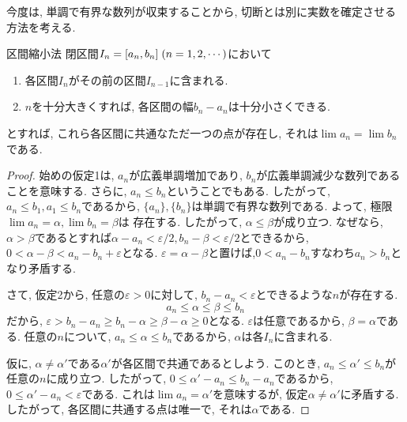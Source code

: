         今度は, 単調で有界な数列が収束することから, 切断とは別に実数を確定させる方法を考える.
        \begin{itembox}{区間縮小法}
            閉区間$I_n=[a_n,b_n]\hspace{1mm}(n=1,2,\cdots)$において
            \begin{enumerate}
                \item 各区間$I_n$がその前の区間$I_{n-1}$に含まれる.
                \item $n$を十分大きくすれば, 各区間の幅$b_n-a_n$は十分小さくできる.
            \end{enumerate}
            とすれば, これら各区間に共通なただ一つの点が存在し, それは$\lim a_n=\lim b_n$である.
        \end{itembox}
        \begin{proof}
            始めの仮定1は, $a_n$が広義単調増加であり, $b_n$が広義単調減少な数列であることを意味する. さらに, $a_n\leq b_n$ということでもある.
            したがって, $a_n\leq b_1,a_1\leq b_n$であるから, $\{a_n\},\{b_n\}$は単調で有界な数列である. よって, 極限$\lim a_n =\alpha , \lim b_n=\beta$は
            存在する. したがって, $\alpha\leq \beta$が成り立つ. なぜなら, $\alpha>\beta$であるとすれば$\alpha -a_n<\varepsilon/2,b_n-\beta<\varepsilon/2$とできるから, 
            $0<\alpha-\beta<a_n-b_n+\varepsilon$となる. $\varepsilon=\alpha-\beta$と置けば,$0<a_n-b_n$すなわち$a_n>b_n$となり矛盾する.
            
            さて, 仮定2から, 任意の$\varepsilon>0$に対して, $b_n-a_n<\varepsilon$とできるような$n$が存在する. 
            \begin{equation*}
                a_n\leq \alpha\leq \beta\leq b_n
            \end{equation*}
            だから, $\varepsilon>b_n-a_n\geq b_n-\alpha\geq \beta - \alpha\geq0$となる. $\varepsilon$は任意であるから, $\beta=\alpha$である.
            任意の$n$について, $a_n\leq \alpha \leq b_n$であるから, $\alpha$は各$I_n$に含まれる. 
            
            仮に, $\alpha\neq \alpha'$である$\alpha'$が各区間で共通であるとしよう. このとき, $a_n\leq \alpha'\leq b_n$が任意の$n$に成り立つ.
            したがって, $0\leq \alpha'-a_n \leq b_n - a_n$であるから, $0\leq \alpha'-a_n<\varepsilon$である. これは$\lim a_n=\alpha'$を意味するが, 
            仮定$\alpha\neq\alpha'$に矛盾する. したがって, 各区間に共通する点は唯一で, それは$\alpha$である.
        \end{proof}

